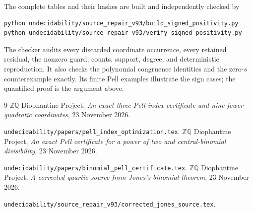 \documentclass[11pt]{article}
\begin{document}
The complete tables and their hashes are built and independently
checked by
\begin{verbatim}
python undecidability/source_repair_v93/build_signed_positivity.py
python undecidability/source_repair_v93/verify_signed_positivity.py
\end{verbatim}
The checker audits every discarded coordinate occurrence, every
retained residual, the nonzero guard, counts, support, degree, and
deterministic reproduction. It also checks the polynomial congruence
identities and the zero-\(s\) counterexample exactly. Its finite Pell
examples illustrate the sign cases; the quantified proof is the
argument above.

\begin{thebibliography}{9}
 \(\mathbb Z\mathbb Q\) Diophantine Project,
\emph{An exact three-Pell index certificate and nine fewer quadratic
coordinates}, 23 November 2026.\par
\nolinkurl{undecidability/papers/pell_index_optimization.tex}.
 \(\mathbb Z\mathbb Q\) Diophantine Project,
\emph{An exact Pell certificate for a power of two and central-binomial
divisibility}, 23 November 2026.\par
\nolinkurl{undecidability/papers/binomial_pell_certificate.tex}.
 \(\mathbb Z\mathbb Q\) Diophantine Project,
\emph{A corrected quartic source from Jones's binomial theorem},
23 November 2026.\par
\nolinkurl{undecidability/source_repair_v93/corrected_jones_source.tex}.
\end{thebibliography}
\end{document}
